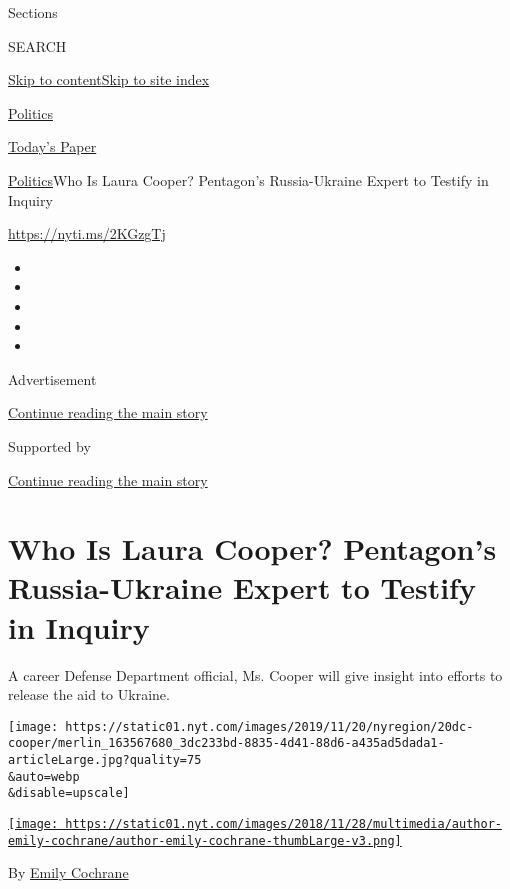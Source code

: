 Sections

SEARCH

\protect\hyperlink{site-content}{Skip to
content}\protect\hyperlink{site-index}{Skip to site index}

\href{https://www.nytimes.com/section/politics}{Politics}

\href{https://myaccount.nytimes.com/auth/login?response_type=cookie\&client_id=vi}{}

\href{https://www.nytimes.com/section/todayspaper}{Today's Paper}

\href{/section/politics}{Politics}\textbar{}Who Is Laura Cooper?
Pentagon's Russia-Ukraine Expert to Testify in Inquiry

\url{https://nyti.ms/2KGzgTj}

\begin{itemize}
\item
\item
\item
\item
\item
\end{itemize}

Advertisement

\protect\hyperlink{after-top}{Continue reading the main story}

Supported by

\protect\hyperlink{after-sponsor}{Continue reading the main story}

\hypertarget{who-is-laura-cooper-pentagons-russia-ukraine-expert-to-testify-in-inquiry}{%
\section{Who Is Laura Cooper? Pentagon's Russia-Ukraine Expert to
Testify in
Inquiry}\label{who-is-laura-cooper-pentagons-russia-ukraine-expert-to-testify-in-inquiry}}

A career Defense Department official, Ms. Cooper will give insight into
efforts to release the aid to Ukraine.

\texttt{[image: https://static01.nyt.com/images/2019/11/20/nyregion/20dc-cooper/merlin\_163567680\_3dc233bd-8835-4d41-88d6-a435ad5dada1-articleLarge.jpg?quality=75\\\&auto=webp\\\&disable=upscale]}

\href{https://www.nytimes.com/by/emily-cochrane}{\texttt{[image: https://static01.nyt.com/images/2018/11/28/multimedia/author-emily-cochrane/author-emily-cochrane-thumbLarge-v3.png]}}

By \href{https://www.nytimes.com/by/emily-cochrane}{Emily Cochrane}

